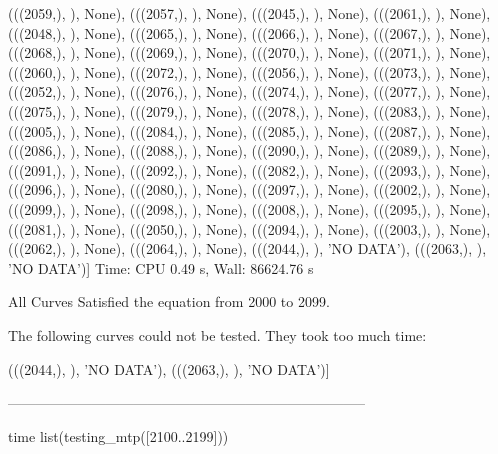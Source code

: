  (((2059,), {}), None),
 (((2057,), {}), None),
 (((2045,), {}), None),
 (((2061,), {}), None),
 (((2048,), {}), None),
 (((2065,), {}), None),
 (((2066,), {}), None),
 (((2067,), {}), None),
 (((2068,), {}), None),
 (((2069,), {}), None),
 (((2070,), {}), None),
 (((2071,), {}), None),
 (((2060,), {}), None),
 (((2072,), {}), None),
 (((2056,), {}), None),
 (((2073,), {}), None),
 (((2052,), {}), None),
 (((2076,), {}), None),
 (((2074,), {}), None),
 (((2077,), {}), None),
 (((2075,), {}), None),
 (((2079,), {}), None),
 (((2078,), {}), None),
 (((2083,), {}), None),
 (((2005,), {}), None),
 (((2084,), {}), None),
 (((2085,), {}), None),
 (((2087,), {}), None),
 (((2086,), {}), None),
 (((2088,), {}), None),
 (((2090,), {}), None),
 (((2089,), {}), None),
 (((2091,), {}), None),
 (((2092,), {}), None),
 (((2082,), {}), None),
 (((2093,), {}), None),
 (((2096,), {}), None),
 (((2080,), {}), None),
 (((2097,), {}), None),
 (((2002,), {}), None),
 (((2099,), {}), None),
 (((2098,), {}), None),
 (((2008,), {}), None),
 (((2095,), {}), None),
 (((2081,), {}), None),
 (((2050,), {}), None),
 (((2094,), {}), None),
 (((2003,), {}), None),
 (((2062,), {}), None),
 (((2064,), {}), None),
 (((2044,), {}), 'NO DATA'),
 (((2063,), {}), 'NO DATA')]
Time: CPU 0.49 s, Wall: 86624.76 s

All Curves Satisfied the equation from 2000 to 2099.

The following curves could not be tested.
They took too much time:

 (((2044,), {}), 'NO DATA'),
 (((2063,), {}), 'NO DATA')]


-----------------------------------------------------------------------------

time list(testing_mtp([2100..2199]))

